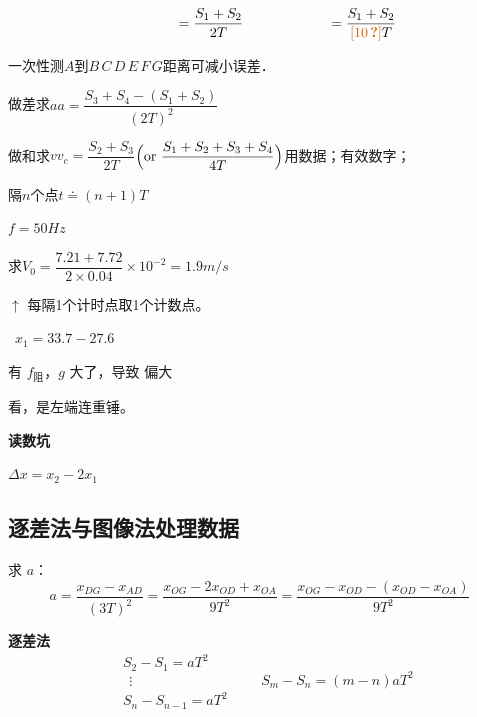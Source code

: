 \[
\hspace{4em}=\frac{S_1+S_2}{2T}\hspace{6em}=\frac{S_1+S_2}{\text{\unclear{10}}T} %
\]

\begin{center}
一次性测$A$到$B\,C\,D\,E\,F\,G$距离可减小误差．
\end{center}

做差求$a$\quad $a=\dfrac{S_3+S_4-(S_1+S_2)}{(2T)^2}$

做和求$v$\quad $v_c=\dfrac{S_2+S_3}{2T}$\quad $\Bigl(\text{or}\ \dfrac{S_1+S_2+S_3+S_4}{4T}\Bigr)$\quad {}用数据；有效数字；

隔$n$个点\quad {}\quad $t\doteq(n+1)T$ %

$f=50\unit{Hz}$


求$V_0=\dfrac{7.21+7.72}{2\times0.04}\times10^{-2}=1.9\unit{m/s}$

$\uparrow$ 每隔1个计时点取1个计数点。


\ $x_1=33.7-27.6$

有 $f_{\text{阻}}$，$g$ 大了，导致  偏大%

看，是左端连重锤。

\textbf{读数坑}


$\Delta x=x_2-2x_1$

\subsection{逐差法与图像法处理数据}

求 $a$：
\[ a=\frac{x_{DG}-x_{AD}}{(3T)^2}=\frac{x_{OG}-2x_{OD}+x_{OA}}{9T^2}=\frac{x_{OG}-x_{OD}-(x_{OD}-x_{OA})}{9T^2} \]

\textbf{逐差法}
\[
\begin{aligned}
&S_2-S_1=aT^2\\
&\ \ \vdots\\
&S_n-S_{n-1}=aT^2
\end{aligned}
\qquad S_m-S_n=(m-n)aT^2
\]

